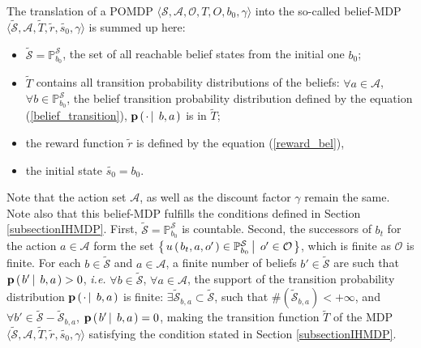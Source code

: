 The translation of a POMDP $\langle \mathcal{S}, \mathcal{A}, \mathcal{O}, T, O, b_0, \gamma \rangle$ 
into the so-called belief-MDP $\langle \tilde{\mathcal{S}}, \mathcal{A}, \tilde{T}, \tilde{r}, \tilde{s_0}, \gamma \rangle$ 
is summed up here: 
\begin{itemize}
\item $\tilde{\mathcal{S}} = \mathbb{P}_{b_0}^{\mathcal{S}}$, the set of all reachable belief states from the initial one $b_0$;
\item $\tilde{T}$ contains all transition probability distributions
of the beliefs: $\forall a \in \mathcal{A}$, $\forall b \in  \mathbb{P}_{b_0}^{\mathcal{S}}$, 
the belief transition probability distribution defined by the equation (\ref{belief_transition}),
$\textbf{p} \left( \left.  \cdot \, \right| \left. \, b, a  \right. \right)$ is in $\tilde{T}$; 
\item the reward function $\tilde{r}$ is defined by the equation (\ref{reward_bel}),
\item the initial state $\tilde{s_0} = b_0$.
\end{itemize}
Note that the action set $\mathcal{A}$, as well as the discount factor $\gamma$
remain the same.
Note also that this belief-MDP fulfills the conditions 
defined in Section \ref{subsectionIHMDP}.
First, $\tilde{\mathcal{S}} = \mathbb{P}^{\mathcal{S}}_{b_0}$ is countable.
Second, the successors of $b_t$ for the action $a \in \mathcal{A}$ 
form the set $\left\{ \left.  u \left( \left.  b_t,a,o' \right. \right) \in \mathbb{P}^{\mathcal{S}}_{b_0} \, \right| \left. \, o' \in \mathcal{O}  \right. \right\}$,
which is finite as $\mathcal{O}$ is finite.
For each $b \in \tilde{\mathcal{S}}$
and $a \in \mathcal{A}$,
a finite number of beliefs $b' \in \tilde{\mathcal{S}}$ 
are such that $\textbf{p} \left( \left.  b' \, \right| \left. \, b, a  \right. \right)>0$,
\textit{i.e.} $\forall b \in \tilde{\mathcal{S}}$, 
$\forall a \in \mathcal{A}$, 
the support of the transition probability distribution  
$\mathbf{p} \left( \left.  \cdot \, \right| \left. \, b,a  \right. \right)$ is finite: 
$\exists \tilde{\mathcal{S}}_{b,a} \subset \tilde{\mathcal{S}}$, such that
$\# (\tilde{\mathcal{S}}_{b,a})< +\infty$, 
and $\forall b' \in \tilde{\mathcal{S}} - \tilde{\mathcal{S}}_{b,a}$, 
$\textbf{p} \left( \left.  b' \, \right| \left. \, b,a \right. \right)=0$,
making the transition function $\tilde{T}$ 
of the MDP $\langle \tilde{\mathcal{S}}, \mathcal{A}, \tilde{T}, \tilde{r}, \tilde{s_0}, \gamma \rangle$
satisfying the condition stated in Section \ref{subsectionIHMDP}.

